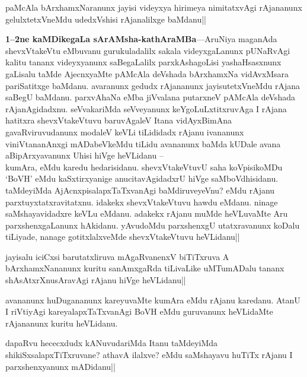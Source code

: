
\begin{artha}
paMcAla bArxhamxNaranunx jayisi videyxya hirimeya nimitatxvAgi 
rAjananunx gelulxtetxVneMdu udedxVshisi rAjanalilxge baMdanu||
\end{artha}

\textbf{1--2ne kaMDikegaLa sArAMsha-kathAraMBa}---AruNiya maganAda 
shevxVtakeVtu eMbuvanu gurukuladalilx sakala videyxgaLanunx pUNaRvAgi 
kalitu tananx videyxyanunx saBegaLalilx parxkAshagoLisi yashaHsasxnunx 
gaLisalu taMde AjecnxyaMte pAMcAla deVshada bArxhamxNa vidAvxMsara 
pariSatitxge baMdanu. avaranunx gedudx rAjananunx jayisutetxVneMdu 
rAjana saBegU baMdanu. parxvAhaNa eMba jiVvalana putarxneV pAMcAla 
deVshada rAjanAgidadxnu. seVvakariMda seVveyanunx keYgoLuLxtitxruvAga 
I rAjana hatitxra shevxVtakeVtuvu baruvAgaleV Itana vidAyxBimAna 
gavaRviruvudanunx modaleV keVLi tiLididadx rAjanu ivananunx 
viniVtananAnxgi mADabeVkeMdu tiLidu avananunx baMda kUDale avana 
aBipArxyavanunx Uhisi hiVge heVLidanu --\\
kumAra, eMdu karedu hedarisidanu. shevxVtakeVtuvU saha koVpisikoMDu 
`BoVH' eMdu kaSxtirxyanige anucitavAgidadxrU hiVge saMboVdhisidanu. 
taMdeyiMda AjAcnxpisalapxTaTxvanAgi baMdiruveyeVnu? eMdu rAjanu 
parxtuyxtatxravitatxnu. idakekx shevxVtakeVtuvu hawdu eMdanu. ninage 
saMshayavidadxre keVLu eMdanu. adakekx rAjanu muMde heVLuvaMte Aru 
parxshenxgaLanunx hAkidanu. yAvudoMdu parxshenxgU utatxravanunx koDalu 
tiLiyade, nanage gotitxlalxveMde shevxVtakeVtuvu heVLidanu||

\begin{artha}
jayisalu iciCxsi barutatxliruva mAgaRvanenxV biTiTxruva A 
bArxhamxNananunx kuritu sanAmxgaRda tiLivaLike uMTumADalu tananx 
shAsAtxrXnusAravAgi rAjanu hiVge heVLidanu||
\end{artha}

\begin{artha}
avananunx huDugananunx kareyuvaMte kumAra eMdu rAjanu karedanu. AtanU 
I riVtiyAgi kareyalapxTaTxvanAgi BoVH eMdu guruvanunx heVLidaMte 
rAjananunx kuritu heVLidanu.
\end{artha}


\begin{artha}
dapaRvu hececxdudx kANuvudariMda Itanu taMdeyiMda 
shikiSxsalapxTiTxruvane? athavA ilalxve? eMdu saMshayavu huTiTx rAjanu 
I parxshenxyanunx mADidanu||
\end{artha}

